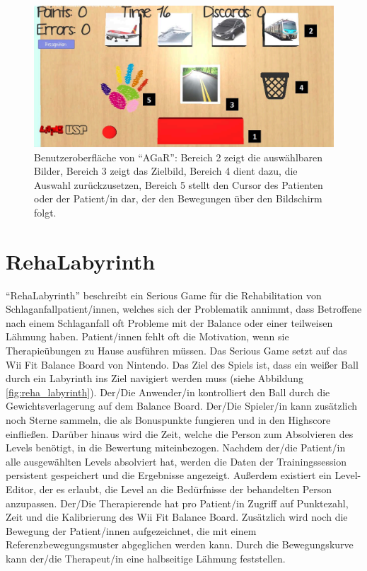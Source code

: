 \begin{figure}[h]
    \centering
	\includegraphics[width=0.8\linewidth]{figures/state_of_the_art/agar}
	\caption{Benutzeroberfläche von \enquote{AGaR}: Bereich 2 zeigt die auswählbaren Bilder, Bereich 3 zeigt das Zielbild, Bereich 4 dient dazu, die Auswahl zurückzusetzen, Bereich 5 stellt den Cursor des Patienten oder der Patient/in dar, der den Bewegungen über den Bildschirm folgt. \cite{funabashi:agar:2017}}
	\label{fig:agar}
\end{figure}

\section{RehaLabyrinth}\label{sec:reha-labyrinth}
\enquote{RehaLabyrinth} beschreibt ein Serious Game für die Rehabilitation von Schlaganfallpatient/innen, welches sich der Problematik annimmt, dass Betroffene nach einem Schlaganfall oft Probleme mit der Balance oder einer teilweisen Lähmung haben. Patient/innen fehlt oft die Motivation, wenn sie Therapieübungen zu Hause ausführen müssen. Das Serious Game setzt auf das Wii Fit Balance Board von Nintendo. Das Ziel des Spiels ist, dass ein weißer Ball durch ein Labyrinth ins Ziel navigiert werden muss (siehe Abbildung \ref{fig:reha_labyrinth}). Der/Die Anwender/in kontrolliert den Ball durch die Gewichtsverlagerung auf dem Balance Board. Der/Die Spieler/in kann zusätzlich noch Sterne sammeln, die als Bonuspunkte fungieren und in den Highscore einfließen. Darüber hinaus wird die Zeit, welche die Person zum Absolvieren des Levels benötigt, in die Bewertung miteinbezogen. Nachdem der/die Patient/in alle ausgewählten Levels absolviert hat, werden die Daten der Trainingssession persistent gespeichert und die Ergebnisse angezeigt. Außerdem existiert ein Level-Editor, der es erlaubt, die Level an die Bedürfnisse der behandelten Person anzupassen. Der/Die Therapierende hat pro Patient/in Zugriff auf Punktezahl, Zeit und die Kalibrierung des Wii Fit Balance Board. Zusätzlich wird noch die Bewegung der Patient/innen aufgezeichnet, die mit einem Referenzbewegungsmuster abgeglichen werden kann. Durch die Bewegungskurve kann der/die Therapeut/in eine halbseitige Lähmung feststellen. \cite{baranyi:reha_labyrinth:2013}

